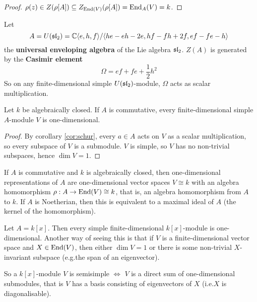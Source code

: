 \begin{proof}
	$\rho(z) \in Z(\rho[A]) \subseteq Z_{\operatorname{End}(V)}(\rho[A]) = \operatorname{End}_A(V) = k$.
\end{proof}

\begin{exam}
	Let
	\[A = U(\operatorname{\mathfrak{sl}}_2) = \mathbb{C}{\left\langle e,h,f \right\rangle}/{\left\langle he-eh-2e,hf-fh+2f,ef-fe-h \right\rangle}\]
	the \textbf{universal enveloping algebra} of the Lie algebra $\operatorname{\mathfrak{sl}}_2$.
	$Z(A)$ is generated by the \textbf{Casimir element}
	\[\Omega = ef+fe+\frac 12h^2\]
	So on any finite-dimensional simple $U(\operatorname{\mathfrak{sl}}_2)$-module, $\Omega$ acts as scalar multiplication.
\end{exam}

\begin{prop}
	Let $k$ be algebraically closed.
	If $A$ is commutative, every finite-dimensional simple $A$-module $V$ is one-dimensional.
\end{prop}

\begin{proof}
	By corollary \ref{cor:schur}, every $a \in A$ acts on $V$ as a scalar multiplication, so every subspace of $V$ is a submodule.
	$V$ is simple, so $V$ has no non-trivial subspaces, hence $\dim V = 1$.
\end{proof}

\begin{note}
	If $A$ is commutative and $k$ is algebraically closed, then one-dimensional representations of $A$ are one-dimensional vector spaces $V \cong k$ with an algebra homomorphism $\rho: A \to \operatorname{End}(V) \cong k$, that is, an algebra homomorphism from $A$ to $k$.
	If $A$ is Noetherian, then this is equivalent to a maximal ideal of $A$ (the kernel of the homomorphism).
\end{note}

\begin{exam}
	Let $A = k[x]$.
	Then every simple finite-dimensional $k[x]$-module is one-dimensional.
	Another way of seeing this is that if $V$ is a finite-dimensional vector space and $X \in \operatorname{End}(V)$, then either $\dim V=1$ or there is some non-trivial $X$-invariant subspace (e.g.\@ the span of an eigenvector).
	
	So a $k[x]$-module $V$ is semisimple $\iff$ $V$ is a direct sum of one-dimensional submodules, that is $V$ has a basis consisting of eigenvectors of $X$ (i.e.\@ $X$ is diagonalisable).
\end{exam}
